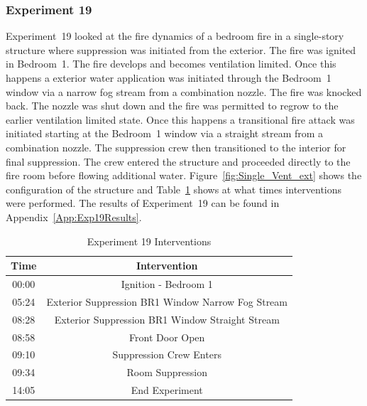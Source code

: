 \documentclass[12pt,oneside]{book}
\begin{document}
\subsubsection{Experiment 19}
Experiment~19 looked at the fire dynamics of a bedroom fire in a single-story structure where suppression was initiated from the exterior. The fire was ignited in Bedroom~1. The fire develops and becomes ventilation limited. Once this happens a exterior water application was initiated through the Bedroom~1 window via a narrow fog stream from a combination nozzle. The fire was knocked back. The nozzle was shut down and the fire was permitted to regrow to the earlier ventilation limited state.  Once this happens a transitional fire attack was initiated starting at the Bedroom~1 window via a straight stream from a combination nozzle. The suppression crew then transitioned to the interior for final suppression. The crew entered the structure and proceeded directly to the fire room before flowing additional water. Figure~\ref{fig:Single_Vent_ext} shows the configuration of the structure and Table~\ref{Table:Exp19Interventions} shows at what times interventions were performed. The results of Experiment~19 can be found in Appendix~\ref{App:Exp19Results}. 


\begin{table}[H]
	\centering
	\caption{Experiment 19 Interventions}
	\begin{tabular}{|c|c|} 
		\hline
		Time & Intervention \\ \hline \hline
		00:00 & Ignition - Bedroom 1 \\ \hline
		05:24 & Exterior Suppression BR1 Window Narrow Fog Stream \\ \hline
		08:28 & Exterior Suppression BR1 Window Straight Stream \\ \hline
		08:58 & Front Door Open \\ \hline
		09:10 & Suppression Crew Enters\\ \hline
		09:34 & Room Suppression \\ \hline 
		14:05 & End Experiment\\ \hline
	\end{tabular}
	\label{Table:Exp19Interventions}
\end{table}

\FloatBarrier
\end{document}
